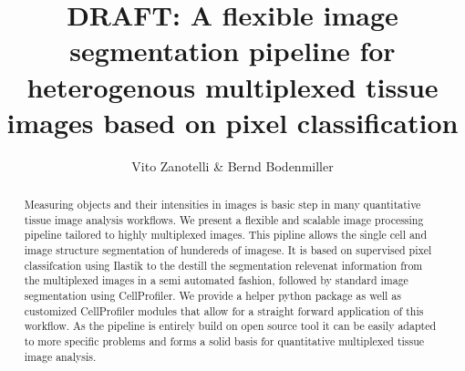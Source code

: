 \documentclass[a4paper]{article}
\title{DRAFT: A flexible image segmentation pipeline for heterogenous multiplexed tissue images based on pixel classification}
\author{Vito Zanotelli \& Bernd Bodenmiller}
\begin{document}
\maketitle

\begin{abstract}
Measuring objects and their intensities in images is basic step in many quantitative tissue image
analysis workflows. We present a flexible and scalable image processing pipeline tailored to
highly multiplexed images. This pipline allows the single cell and image structure segmentation of
hundereds of imagese. It is based on supervised pixel classifcation using Ilastik to the destill the
segmentation relevenat information from the multiplexed images in a semi automated fashion,
followed by standard image segmentation using CellProfiler. We provide a helper python package as
well as customized CellProfiler modules that allow for a straight forward application of this
workflow. As the pipeline is entirely build on open source tool it can be easily adapted to more
specific problems and forms a solid basis for quantitative multiplexed tissue image analysis.

\end{abstract}
\end{document}
